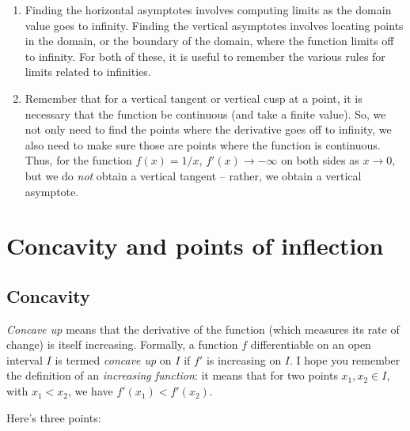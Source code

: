 \documentclass[10pt]{amsart}
\begin{document}
\begin{enumerate}
\item Finding the horizontal asymptotes involves computing limits as
  the domain value goes to infinity. Finding the vertical asymptotes
  involves locating points in the domain, or the boundary of the
  domain, where the function limits off to infinity. For both of
  these, it is useful to remember the various rules for limits related
  to infinities.
\item Remember that for a vertical tangent or vertical cusp at a
  point, it is necessary that the function be continuous (and take a
  finite value). So, we not only need to find the points where the
  derivative goes off to infinity, we also need to make sure those are
  points where the function is continuous. Thus, for the function
  $f(x) = 1/x$, $f'(x) \to - \infty$ on both sides as $x \to 0$, but
  we do {\em not} obtain a vertical tangent -- rather, we obtain a
  vertical asymptote.
\end{enumerate}

\section{Concavity and points of inflection}

\subsection{Concavity}

{\em Concave up} means that the derivative of the function (which
measures its rate of change) is itself increasing. Formally, a
function $f$ differentiable on an open interval $I$ is termed {\em
concave up} on $I$ if $f'$ is increasing on $I$. I hope you remember
the definition of an {\em increasing function}: it means that for two
points $x_1, x_2 \in I$, with $x_1 < x_2$, we have $f'(x_1) < f'(x_2)$.

Here's three points:
\end{document}
